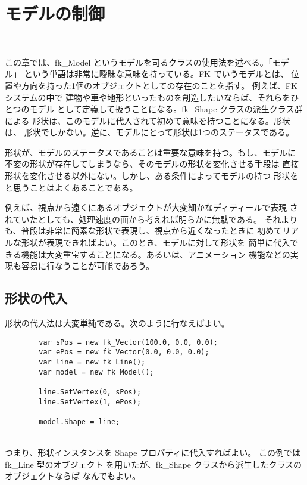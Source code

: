 \chapter{モデルの制御} \label{chap:model} ~

この章では、fk\_Model というモデルを司るクラスの使用法を述べる。「モデル」
という単語は非常に曖昧な意味を持っている。FK でいうモデルとは、
位置や方向を持った1個のオブジェクトとしての存在のことを指す。
例えば、FK システムの中で
建物や車や地形といったものを創造したいならば、それらをひとつのモデル
として定義して扱うことになる。fk\_Shape クラスの派生クラス群による
形状は、このモデルに代入されて初めて意味を持つことになる。形状は、
形状でしかない。逆に、モデルにとって形状は1つのステータスである。

形状が、モデルのステータスであることは重要な意味を持つ。もし、モデルに
不変の形状が存在してしまうなら、そのモデルの形状を変化させる手段は
直接形状を変化させる以外にない。しかし、ある条件によってモデルの持つ
形状をと思うことはよくあることである。

例えば、視点から遠くにあるオブジェクトが大変細かなディティールで表現
されていたとしても、処理速度の面から考えれば明らかに無駄である。
それよりも、普段は非常に簡素な形状で表現し、視点から近くなったときに
初めてリアルな形状が表現できればよい。このとき、モデルに対して形状を
簡単に代入できる機能は大変重宝することになる。あるいは、アニメーション
機能などの実現も容易に行なうことが可能であろう。
\section{形状の代入}
形状の代入法は大変単純である。次のように行なえばよい。
\\
\begin{breakbox}
\begin{verbatim}
        var sPos = new fk_Vector(100.0, 0.0, 0.0);
        var ePos = new fk_Vector(0.0, 0.0, 0.0);
        var line = new fk_Line();
        var model = new fk_Model();

        line.SetVertex(0, sPos);
        line.SetVertex(1, ePos);

        model.Shape = line;
\end{verbatim}
\end{breakbox}
~ \\
つまり、形状インスタンスを Shape プロパティに代入すればよい。
この例では fk\_Line 型のオブジェクト
を用いたが、fk\_Shape クラスから派生したクラスのオブジェクトならば
なんでもよい。

